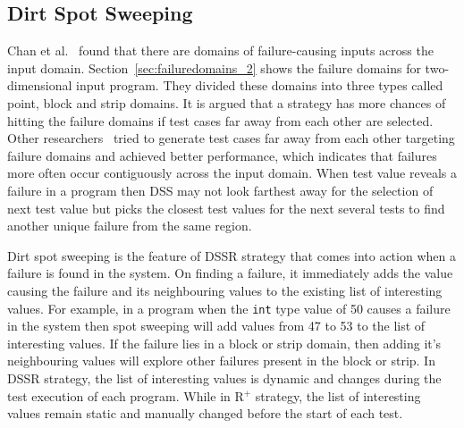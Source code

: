 \subsection{Dirt Spot Sweeping}
Chan et al.~\cite{chan1996proportional} found that there are domains of failure-causing inputs across the input domain. Section~\ref{sec:failuredomains_2} shows the failure domains for two-dimensional input program. They divided these domains into three types called point, block and strip domains. It is argued that a strategy has more chances of hitting the failure domains if test cases far away from each other are selected. Other researchers~\cite{chan2003normalized, chen2004mirror, chen2007quasi} tried to generate test cases far away from each other targeting failure domains and achieved better performance, which indicates that failures more often occur contiguously across the input domain. When test value reveals a failure in a program then DSS may not look farthest away for the selection of next test value but picks the closest test values for the next several tests to find another unique failure from the same region.






Dirt spot sweeping is the feature of DSSR strategy that comes into action when a failure is found in the system. On finding a failure, it immediately adds the value causing the failure and its neighbouring values to the existing list of interesting values. For example, in a program when the \verb+int+ type value of 50 causes a failure in the system then spot sweeping will add values from 47 to 53 to the list of interesting values. If the failure lies in a block or strip domain, then adding it's neighbouring values will explore other failures present in the block or strip. In DSSR strategy, the list of interesting values is dynamic and changes during the test execution of each program. While in R$^+$ strategy, the list of interesting values remain static and manually changed before the start of each test.

